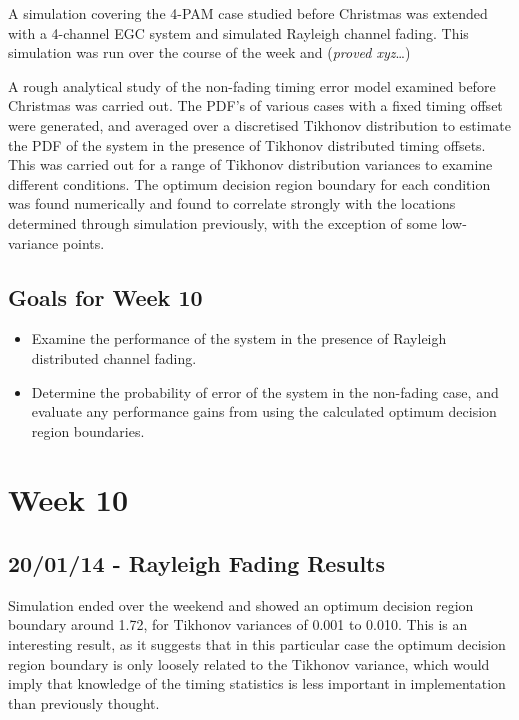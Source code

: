 A simulation covering the 4-PAM case studied before Christmas was
extended with a 4-channel EGC system and simulated Rayleigh channel
fading. This simulation was run over the course of the week and
(\emph{proved xyz}\ldots{})

A rough analytical study of the non-fading timing error model examined
before Christmas was carried out. The PDF's of various cases with a
fixed timing offset were generated, and averaged over a discretised
Tikhonov distribution to estimate the PDF of the system in the presence
of Tikhonov distributed timing offsets. This was carried out for a range
of Tikhonov distribution variances to examine different conditions. The
optimum decision region boundary for each condition was found
numerically and found to correlate strongly with the locations
determined through simulation previously, with the exception of some
low-variance points.

\subsection{Goals for Week 10}

\begin{itemize}
\itemsep1pt\parskip0pt
\item
  Examine the performance of the system in the presence of Rayleigh
  distributed channel fading.
\item
  Determine the probability of error of the system in the non-fading
  case, and evaluate any performance gains from using the calculated
  optimum decision region boundaries.
\end{itemize}

\section{Week 10}

\subsection{20/01/14 - Rayleigh Fading Results}

Simulation ended over the weekend and showed an optimum decision region
boundary around 1.72, for Tikhonov variances of 0.001 to 0.010. This is
an interesting result, as it suggests that in this particular case the
optimum decision region boundary is only loosely related to the Tikhonov
variance, which would imply that knowledge of the timing statistics is
less important in implementation than previously thought.

